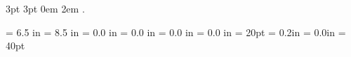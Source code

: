 \usepackage{graphicx}
\usepackage{amssymb}
\usepackage{palatino}
\usepackage{helvet}
\usepackage{amsthm}
\usepackage{ifthen}
\usepackage{dirtree}
\usepackage{listings}
\usepackage{float}
%

\usepackage[hang]{caption}
\setlength{\captionmargin}{30pt}
\renewcommand{\captionlabelfont}{\sffamily\bfseries}

\newcommand{\projname}{Default}

     {3pt}%
     {3pt}%
     {}%
     {0em}%
     {\bfseries\sffamily}%
     {}%
     {2em}%
     {.\quad\rmfamily{}}%
\theoremstyle{requirement}
\newtheorem{requirement}{R}

\newenvironment{sourcecode}
{\begin{minipage}[h]{0.7\linewidth}
\hrulefill
}{
\hrulefill%
\end{minipage}%
}

\textwidth = 6.5 in
\textheight = 8.5 in
\oddsidemargin = 0.0 in
\evensidemargin = 0.0 in
\topmargin = 0.0 in
\headheight = 0.0 in
\headsep = 20pt
\parskip = 0.2in
\parindent = 0.0in
\footskip = 40pt
\setlength{\parskip}{3ex plus 2ex minus 2ex}


\newcommand{\TINOSProjectLogo}{../template/tinos.pdf}
\newcommand{\TINOSProjectAcronym}{ tinos }
\newcommand{\TINOSProjectName}{ tinos }
\newcommand{\TINOSDocumentTitle}{ }
\newcommand{\TINOSDocumentSynopsis}{}
\newcommand{\TINOSDocumentChangeHistory}{}
\newcommand{\TINOSDocumentForAttentionOf}{ }
\newcommand{\TINOSDocumentDate}{ }
\newcommand{\TINOSDocumentVersion}{ }
\newcommand{\TINOSDocumentStatus}{ }
\newcommand{\TINOSDocumentClassification}{ Public}




